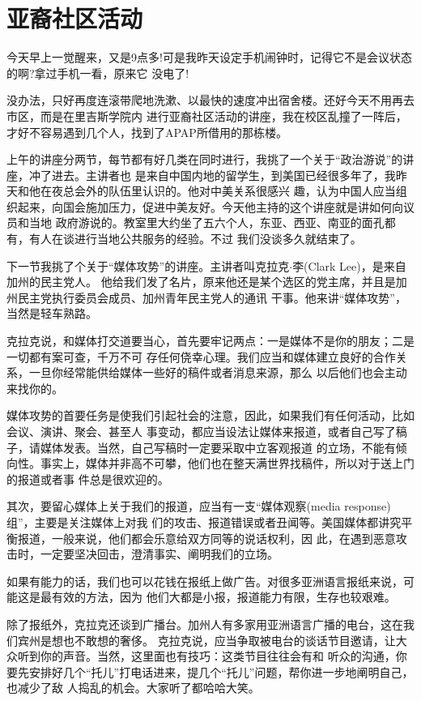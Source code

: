﻿\documentclass[11pt]{article}
\begin{document}
\section{亚裔社区活动}

今天早上一觉醒来，又是9点多!可是我昨天设定手机闹钟时，记得它不是会议状态的啊?拿过手机一看，原来它
没电了!

没办法，只好再度连滚带爬地洗漱、以最快的速度冲出宿舍楼。还好今天不用再去市区，而是在里吉斯学院内
进行亚裔社区活动的讲座，我在校区乱撞了一阵后，才好不容易遇到几个人，找到了APAP所借用的那栋楼。

上午的讲座分两节，每节都有好几类在同时进行，我挑了一个关于``政治游说''的讲座，冲了进去。主讲者也
是来自中国内地的留学生，到美国已经很多年了，我昨天和他在夜总会外的队伍里认识的。他对中美关系很感兴
趣，认为中国人应当组织起来，向国会施加压力，促进中美友好。今天他主持的这个讲座就是讲如何向议员和当地
政府游说的。教室里大约坐了五六个人，东亚、西亚、南亚的面孔都有，有人在谈进行当地公共服务的经验。不过
我们没谈多久就结束了。

下一节我挑了个关于``媒体攻势''的讲座。主讲者叫克拉克$\cdot$李(Clark Lee)，是来自加州的民主党人。
他给我们发了名片，原来他还是某个选区的党主席，并且是加州民主党执行委员会成员、加州青年民主党人的通讯
干事。他来讲``媒体攻势''，当然是轻车熟路。

克拉克说，和媒体打交道要当心，首先要牢记两点：一是媒体不是你的朋友；二是一切都有案可查，千万不可
存任何侥幸心理。我们应当和媒体建立良好的合作关系，一旦你经常能供给媒体一些好的稿件或者消息来源，那么
以后他们也会主动来找你的。

媒体攻势的首要任务是使我们引起社会的注意，因此，如果我们有任何活动，比如会议、演讲、聚会、甚至人
事变动，都应当设法让媒体来报道，或者自己写了稿子，请媒体发表。当然，自己写稿时一定要采取中立客观报道
的立场，不能有倾向性。事实上，媒体并非高不可攀，他们也在整天满世界找稿件，所以对于送上门的报道或者事
件总是很欢迎的。

其次，要留心媒体上关于我们的报道，应当有一支``媒体观察(media response)组''，主要是关注媒体上对我
们的攻击、报道错误或者丑闻等。美国媒体都讲究平衡报道，一般来说，他们都会乐意给双方同等的说话权利，因
此，在遇到恶意攻击时，一定要坚决回击，澄清事实、阐明我们的立场。

如果有能力的话，我们也可以花钱在报纸上做广告。对很多亚洲语言报纸来说，可能这是最有效的方法，因为
他们大都是小报，报道能力有限，生存也较艰难。

除了报纸外，克拉克还谈到广播台。加州人有多家用亚洲语言广播的电台，这在我们宾州是想也不敢想的奢侈。
克拉克说，应当争取被电台的谈话节目邀请，让大众听到你的声音。当然，这里面也有技巧：这类节目往往会有和
听众的沟通，你要先安排好几个``托儿''打电话进来，提几个``托儿''问题，帮你进一步地阐明自己，也减少了敌
人捣乱的机会。大家听了都哈哈大笑。
\end{document}
